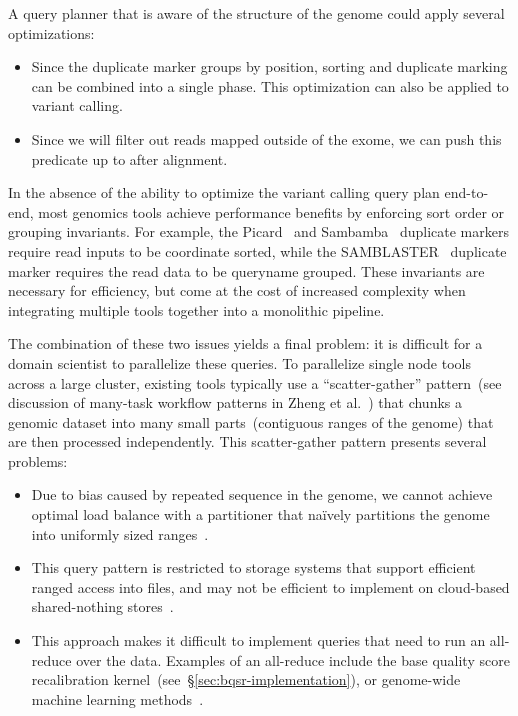 \documentclass[phd]{ucbthesis}
\begin{document}
A query planner that is aware of the structure of the genome could apply several
optimizations:

\begin{itemize}
\item Since the duplicate marker groups by position, sorting and duplicate
  marking can be combined into a single phase. This optimization can also be
  applied to variant calling.
\item Since we will filter out reads mapped outside of the exome, we can push
  this predicate up to after alignment.
\end{itemize}

In the absence of the ability to optimize the variant calling query plan
end-to-end, most genomics tools achieve performance benefits by enforcing
sort order or grouping invariants. For example, the
{Picard}~\cite{picard} and {Sambamba}~\cite{tarasov15}
duplicate markers require read inputs to be coordinate sorted, while the
{SAMBLASTER}~\cite{faust14} duplicate marker requires the read data to
be queryname grouped. These invariants are necessary for efficiency, but come at
the cost of increased complexity when integrating multiple tools together into
a monolithic pipeline.

The combination of these two issues yields a final problem: it is difficult for
a domain scientist to parallelize these queries. To parallelize single node
tools across a large cluster, existing tools typically use a ``scatter-gather''
pattern~(see discussion of many-task workflow patterns in Zheng et
al.~\cite{zhang15, zhang16}) that chunks a genomic dataset into many small
parts~(contiguous ranges of the genome) that are then processed independently.
This scatter-gather pattern presents several problems:

\begin{itemize}
\item Due to bias caused by repeated sequence in the genome, we cannot achieve
  optimal load balance with a partitioner that na\"{i}vely partitions the genome
  into uniformly sized ranges~\cite{chiang15}.
\item This query pattern is restricted to storage systems that support efficient
  ranged access into files, and may not be efficient to implement on cloud-based
  shared-nothing stores~\cite{vivian17}.
\item This approach makes it difficult to implement queries that need to run an
  all-reduce over the data. Examples of an all-reduce include the base quality score
  recalibration kernel~(see~\S\ref{sec:bqsr-implementation}), or genome-wide
  machine learning methods~\cite{morrow17cks}.
\end{itemize}
  
\end{document}
